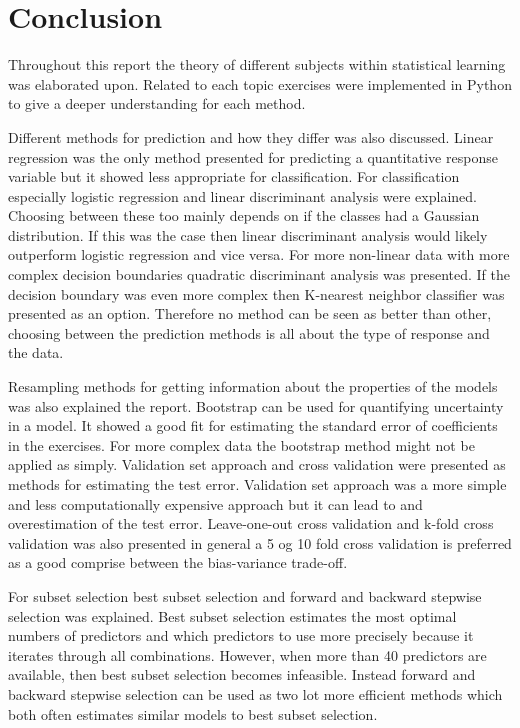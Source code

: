 \chapter{Conclusion}
\label{chp:conc}

Throughout this report the theory of different subjects within statistical learning was elaborated upon. Related to each topic exercises were implemented in Python to give a deeper understanding for each method. 

Different methods for prediction and how they differ was also discussed. Linear regression was the only method presented for predicting a quantitative response variable but it showed less appropriate for classification. For classification especially logistic regression and linear discriminant analysis were explained. Choosing between these too mainly depends on if the classes had a Gaussian distribution. If this was the case then linear discriminant analysis would likely outperform logistic regression and vice versa. For more non-linear data with more complex decision boundaries quadratic discriminant analysis was presented. If the decision boundary was even more complex then K-nearest neighbor classifier was presented as an option. Therefore no method can be seen as better than other, choosing between the prediction methods is all about the type of response and the data.

Resampling methods for getting information about the properties of the models was also explained the report. Bootstrap can be used for quantifying uncertainty in a model. It showed a good fit for estimating the standard error of coefficients in the exercises. For more complex data the bootstrap method might not be applied as simply.
Validation set approach and cross validation were presented as methods for estimating the test error. Validation set approach was a more simple and less computationally expensive approach but it can lead to and overestimation of the test error. Leave-one-out cross validation and k-fold cross validation was also presented in general a 5 og 10 fold cross validation is preferred as a good comprise between the bias-variance trade-off.

For subset selection best subset selection and forward and backward stepwise selection was explained. Best subset selection estimates the most optimal numbers of predictors and which predictors to use more precisely because it iterates through all combinations. However, when more than 40 predictors are available, then best subset selection becomes infeasible. Instead forward and backward stepwise selection can be used as two lot more efficient methods which both often estimates similar models to best subset selection.

